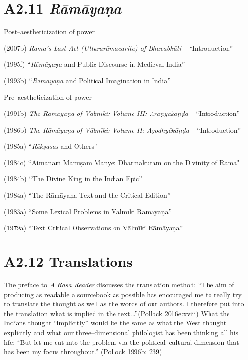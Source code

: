 \vspace{-.6cm}

\section*{A2.11 {\it {\bfseries Rāmāyaṇa}}}

\vspace{-.2cm}

Post–aestheticization of power

(2007b) \textit{Rama's Last Act (Uttararāmacarita) of Bhavabhūti} – “Introduction”

(1995f) “\textit{Rāmāyaṇa} and Public Discourse in Medieval India”

(1993b) “\textit{Rāmāyaṇa} and Political Imagination in India”

Pre–aestheticization of power

(1991b) \textit{The Rāmāyaṇa of Vālmīki: Volume III: Araṇyakāṇḍa} – “Introduction”

(1986b) \textit{The Rāmāyaṇa of Vālmīki: Volume II: Ayodhyākāṇḍa} – “Introduction”

(1985a) “\textit{Rākṣasas} and Others”

(1984c) “Ātmānaṁ Mānuṣam Manye: Dharmākūtam on the Divinity of Rāma"

(1984b) “The Divine King in the Indian Epic”

(1984a) “The Rāmāyaṇa Text and the Critical Edition”

(1983a) “Some Lexical Problems in Vālmīki Rāmāyaṇa”

(1979a) “Text Critical Observations on Vālmīki Rāmāyaṇa”

\vspace{-.3cm}

\section*{A2.12 Translations}

The preface to \textit{A Rasa Reader} discusses the translation method: “The aim of producing as readable a sourcebook as possible has encouraged me to really try to translate the thought as well as the words of our authors. I therefore put into the translation what is implied in the text...”(Pollock 2016e:xviii)  What the Indians thought “implicitly” would be the same as what the West thought explicitly and what our three–dimensional philologist has been thinking all his life: “But let me cut into the problem via the political–cultural dimension that has been my focus throughout.” (Pollock 1996b: 239)

